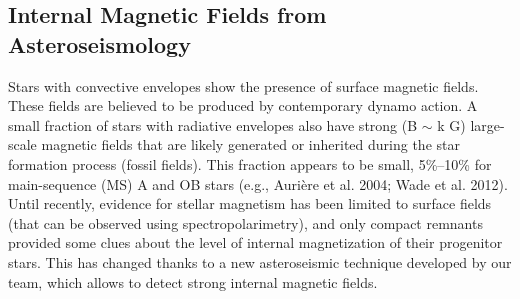 {\color{red}\subsection{Internal Magnetic Fields from Asteroseismology}}
Stars with convective envelopes show the presence of
surface magnetic fields. These fields are believed to be produced by contemporary dynamo action.
A small fraction of stars with radiative envelopes also have strong (B $\sim$ k G)
large-scale magnetic fields that are likely generated or inherited during the star
formation process (fossil fields). 
This fraction appears to be small, 5\%–10\% for main-sequence (MS) A and OB stars (e.g., Aurière et al. 2004; Wade et al. 2012). Until recently, evidence for stellar magnetism has been limited to surface fields (that can be observed using spectropolarimetry),
and only compact remnants provided some clues about the level of internal magnetization of their progenitor stars.
This has changed thanks to a new asteroseismic technique developed by our team, which allows to detect strong internal magnetic fields.